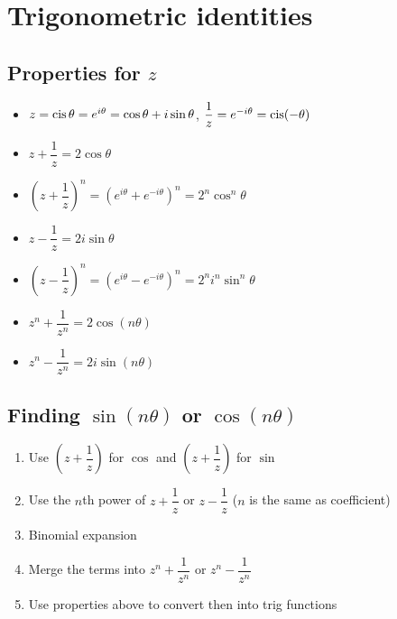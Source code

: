 \section{Trigonometric identities}
\subsection{Properties for $z$}
\begin{itemize}
	\item $z=\operatorname{cis}\theta=e^{i\theta}=\cos\theta + i\sin\theta$, $\dfrac{1}{z} = e^{-i\theta} = \operatorname{cis} (-\theta)$
	\item $z+\dfrac{1}{z}=2\cos\theta$
	\item $(z+\dfrac{1}{z})^n=(e^{i\theta}+e^{-i\theta})^n=2^n\cos^n\theta$
	\item $z-\dfrac{1}{z}=2i\sin\theta$
	\item $(z-\dfrac{1}{z})^n=(e^{i\theta}-e^{-i\theta})^n=2^n i^n \sin^n\theta$
	\item $z^n+\dfrac{1}{z^n}=2\cos (n\theta)$
	\item $z^n-\dfrac{1}{z^n}=2i\sin (n\theta)$
\end{itemize}
\subsection{Finding $\sin (n\theta)$ or $\cos (n\theta)$}
\begin{enumerate}
	\item Use $(z+\dfrac{1}{z})$ for $\cos$ and $(z+\dfrac{1}{z})$ for $\sin$
	\item Use the $n$th power of $z+\dfrac{1}{z}$ or $z-\dfrac{1}{z}$ ($n$ is the same as coefficient)
	\item Binomial expansion
	\item Merge the terms into $z^n+\dfrac{1}{z^n}$ or $z^n-\dfrac{1}{z^n}$
	\item Use properties above to convert then into trig functions
\end{enumerate}
